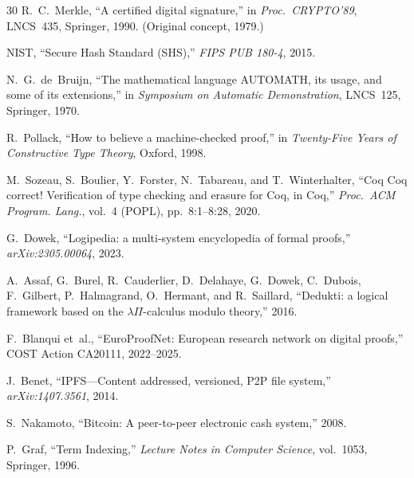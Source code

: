 \documentclass[11pt]{article}
\theoremstyle{definition}
\theoremstyle{plain}
\theoremstyle{remark}
\begin{document}
\begin{thebibliography}{30}
R.~C.~Merkle,
``A certified digital signature,''
in \emph{Proc.\ CRYPTO'89}, LNCS~435, Springer, 1990.
(Original concept, 1979.)

NIST,
``Secure Hash Standard (SHS),''
\emph{FIPS PUB 180-4}, 2015.

N.~G.~de~Bruijn,
``The mathematical language AUTOMATH, its usage, and some of its extensions,''
in \emph{Symposium on Automatic Demonstration}, LNCS~125, Springer, 1970.

R.~Pollack,
``How to believe a machine-checked proof,''
in \emph{Twenty-Five Years of Constructive Type Theory}, Oxford, 1998.

M.~Sozeau, S.~Boulier, Y.~Forster, N.~Tabareau, and T.~Winterhalter,
``Coq Coq correct! Verification of type checking and erasure for Coq, in Coq,''
\emph{Proc.\ ACM Program. Lang.}, vol.~4 (POPL), pp.~8:1--8:28, 2020.

G.~Dowek,
``Logipedia: a multi-system encyclopedia of formal proofs,''
\emph{arXiv:2305.00064}, 2023.

A.~Assaf, G.~Burel, R.~Cauderlier, D.~Delahaye, G.~Dowek, C.~Dubois, F.~Gilbert, P.~Halmagrand,
O.~Hermant, and R.~Saillard,
``Dedukti: a logical framework based on the $\lambda\Pi$-calculus modulo theory,''
2016.

F.~Blanqui et~al.,
``EuroProofNet: European research network on digital proofs,''
COST Action CA20111, 2022--2025.

J.~Benet,
``IPFS---Content addressed, versioned, P2P file system,''
\emph{arXiv:1407.3561}, 2014.

S.~Nakamoto,
``Bitcoin: A peer-to-peer electronic cash system,''
2008.

P.~Graf,
``Term Indexing,''
\emph{Lecture Notes in Computer Science}, vol.~1053, Springer, 1996.

\end{thebibliography}
\end{document}
